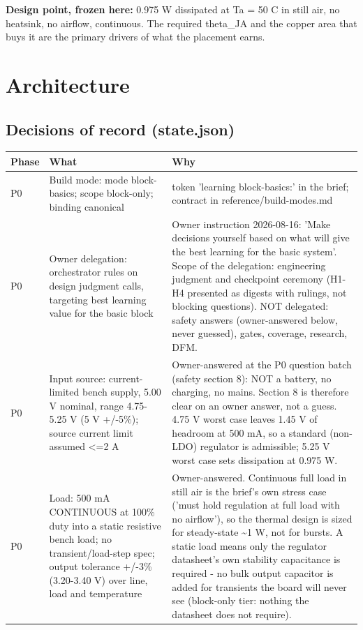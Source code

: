 \documentclass[11pt,a4paper]{article}
\begin{document}
\textbf{Design point, frozen here:} 0.975 W dissipated at Ta = 50 C in still air, no heatsink, no airflow, continuous. The required theta\_JA and the copper area that buys it are the primary drivers of what the placement earns.

\section{Architecture}
\subsection*{Decisions of record (state.json)}
{\small
\begin{longtable}{lp{5.2cm}p{7.2cm}}
\toprule
\textbf{Phase} & \textbf{What} & \textbf{Why} \\
\midrule
\endhead
P0 & Build mode: mode block-basics; scope block-only; binding canonical & token 'learning block-basics:' in the brief; contract in reference/build-modes.md \\
P0 & Owner delegation: orchestrator rules on design judgment calls, targeting best learning value for the basic block & Owner instruction 2026-08-16: 'Make decisions yourself based on what will give the best learning for the basic system'. Scope of the delegation: engineering judgment and checkpoint ceremony (H1-H4 presented as digests with rulings, not blocking questions). NOT delegated: safety answers (owner-answered below, never guessed), gates, coverage, research, DFM. \\
P0 & Input source: current-limited bench supply, 5.00 V nominal, range 4.75-5.25 V (5 V +/-5\%); source current limit assumed \textless{}=2 A & Owner-answered at the P0 question batch (safety section 8): NOT a battery, no charging, no mains. Section 8 is therefore clear on an owner answer, not a guess. 4.75 V worst case leaves 1.45 V of headroom at 500 mA, so a standard (non-LDO) regulator is admissible; 5.25 V worst case sets dissipation at 0.975 W. \\
P0 & Load: 500 mA CONTINUOUS at 100\% duty into a static resistive bench load; no transient/load-step spec; output tolerance +/-3\% (3.20-3.40 V) over line, load and temperature & Owner-answered. Continuous full load in still air is the brief's own stress case ('must hold regulation at full load with no airflow'), so the thermal design is sized for steady-state \textasciitilde{}1 W, not for bursts. A static load means only the regulator datasheet's own stability capacitance is required - no bulk output capacitor is added for transients the board will never see (block-only tier: nothing the datasheet does not require). \\

\end{longtable}}
\end{document}

